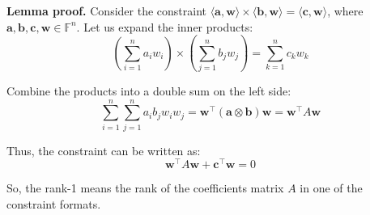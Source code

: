 \documentclass[../lecture-notes.tex]{subfiles}
\begin{document}
\textbf{Lemma proof.} Consider the constraint $\langle \mathbf{a}, \mathbf{w}\rangle \times \langle \mathbf{b}, \mathbf{w}\rangle
= \langle \mathbf{c}, \mathbf{w}\rangle$, where $\mathbf{a}, \mathbf{b}, \mathbf{c}, \mathbf{w} \in \mathbb{F}^n$. Let us expand the inner
products: 
\[ \left(\sum_{i=1}^{n} a_i w_i\right) \times \left(\sum_{j=1}^{n} b_j w_j\right) = \sum_{k=1}^{n} c_k w_k \]

Combine the products into a double sum on the left side:
\[ \sum_{i=1}^{n} \sum_{j=1}^{n} a_i b_j w_i w_j = \mathbf{w}^{\top} (\mathbf{a} \otimes \mathbf{b}) \mathbf{w} = \mathbf{w}^{\top} A \mathbf{w} \]

Thus, the constraint can be written as:
\[ \mathbf{w}^{\top} A \mathbf{w} + \mathbf{c}^{\top} \mathbf{w} = 0 \]

So, the rank-1 means the rank of the coefficients matrix $A$ in one of the constraint formats.
\end{document}
